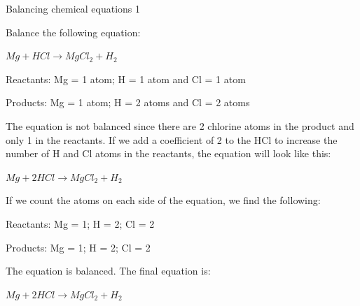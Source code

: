 \begin{wex}{Balancing chemical equations 1}{Balance the following equation:
\begin{center}
\rm${Mg + HCl \rightarrow MgCl_{2} + H_{2}}$\\
\end{center}
}

{

Reactants: Mg = 1 atom; H = 1 atom and Cl = 1 atom

Products: Mg = 1 atom; H = 2 atoms and Cl = 2 atoms\\}

{
The equation is not balanced since there are 2 chlorine atoms in the product and only 1 in the reactants. If we add a coefficient of 2 to the HCl to increase the number of H and Cl atoms in the reactants, the equation will look like this:
\begin{center}
\rm${Mg + 2HCl \rightarrow MgCl_{2} + H_{2}}$\\
\end{center}
}

{
If we count the atoms on each side of the equation, we find the following:

Reactants: Mg = 1; H = 2; Cl = 2

Products: Mg = 1; H = 2; Cl = 2

The equation is balanced. The final equation is:
\begin{center}
\rm${Mg + 2HCl \rightarrow MgCl_{2} + H_{2}}$
\end{center}
}
\end{wex}
    \noindent
\par
            \label{m38726*secfhsst!!!underscore!!!id394}\vspace{.5cm} 
      \noindent
